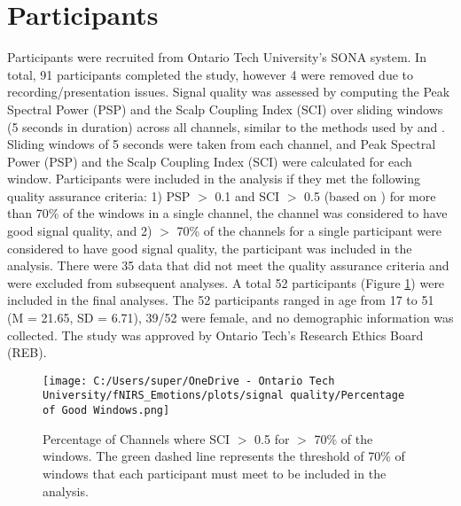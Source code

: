 \section{Participants}
\label{sec:participants}
Participants were recruited from Ontario Tech University's SONA system. 
In total, 91 participants completed the study, however 4 were removed due to recording/presentation issues.
Signal quality was assessed by computing the Peak Spectral Power (PSP) and the Scalp Coupling Index (SCI) \citep{pollonini_phoebe_2016} over sliding windows (5 seconds in duration) across all channels, similar to the methods used by \citep{bulgarelli_growth_2025} and \citep{hernandez_nirsplot_2020}. 
Sliding windows of 5 seconds were taken from each channel, and Peak Spectral Power (PSP) and the Scalp Coupling Index (SCI) were calculated for each window.
Participants were included in the analysis if they met the following quality assurance criteria: 
1) PSP $>$ 0.1 and SCI $>$ 0.5 (based on \citep{holmes_opening_2024}) for more than 70\% of the windows in a single channel, the channel was considered to have good signal quality, and 2) $>$ 70\% of the channels for a single participant were considered to have good signal quality, the participant was included in the analysis.
There were 35 data that did not meet the quality assurance criteria and were excluded from subsequent analyses. 
A total 52 participants (Figure \ref{fig:signal_quality}) were included in the final analyses. 
The 52 participants ranged in age from 17 to 51 (M = 21.65, SD = 6.71), 39/52 were female, and no demographic information was collected. 
The study was approved by Ontario Tech's Research Ethics Board (REB). 

\begin{figure}[H]
    \centering
    \texttt{[image: C:/Users/super/OneDrive - Ontario Tech University/fNIRS\_Emotions/plots/signal quality/Percentage of Good Windows.png]}
    \caption[SCI signal quality inclusion threshold]{Percentage of Channels where SCI $>$ 0.5 for $>$ 70\% of the windows.
    The green dashed line represents the threshold of 70\% of windows that each participant must meet to be included in the analysis.}
    \label{fig:signal_quality}
\end{figure}

